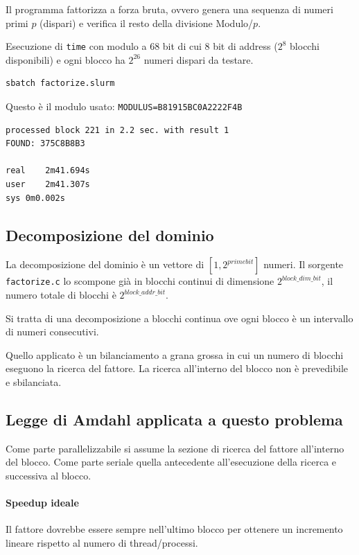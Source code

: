 \documentclass[11pt,a4paper]{article}
\begin{document}
Il programma fattorizza a forza bruta, ovvero genera una sequenza di numeri primi $p$ (dispari) e verifica il resto della divisione Modulo/$p$.

Esecuzione di \texttt{time} con modulo a 68 bit di cui 8 bit di address ($2^8$ blocchi disponibili) e ogni blocco ha $2^{26}$ numeri dispari da testare.

\begin{lstlisting}
sbatch factorize.slurm
\end{lstlisting}

Questo è il modulo usato: \texttt{MODULUS=B81915BC0A2222F4B}

\begin{lstlisting}
processed block 221 in 2.2 sec. with result 1
FOUND: 375C8B8B3

real	2m41.694s
user	2m41.307s
sys	0m0.002s
\end{lstlisting}

\subsection{Decomposizione del dominio}

La decomposizione del dominio è un vettore di $[1,2^{primebit}]$ numeri.
Il sorgente \texttt{factorize.c} lo scompone già in blocchi continui di dimensione $2^{block\_dim\_bit}$, il numero totale di blocchi è $2^{block\_addr\_bit}$.

Si tratta di una decomposizione a blocchi continua ove ogni blocco è un intervallo di numeri consecutivi.

Quello applicato è un bilanciamento a grana grossa in cui un numero di blocchi eseguono la ricerca del fattore. La ricerca all'interno del blocco non è prevedibile e sbilanciata.

\subsection{Legge di Amdahl applicata a questo problema}

Come parte parallelizzabile si assume la sezione di ricerca del fattore all'interno del blocco.
Come parte seriale quella antecedente all'esecuzione della ricerca e successiva al blocco.

\paragraph{Speedup ideale} Il fattore dovrebbe essere sempre nell'ultimo blocco per ottenere un incremento lineare rispetto al numero di thread/processi.
\end{document}
